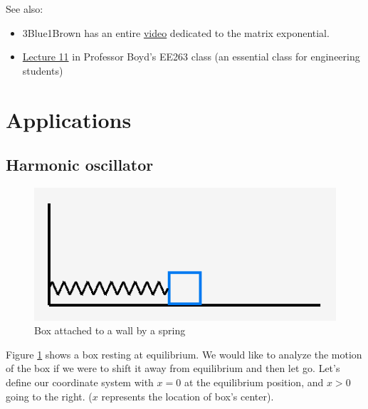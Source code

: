 \documentclass[11pt, oneside]{article}   	%
\begin{document}
See also:
\begin{itemize}
\item 3Blue1Brown has an entire \href{https://youtu.be/O85OWBJ2ayo}{video} dedicated to the matrix exponential.
\item \href{https://www.youtube.com/watch?v=5ePa2UOkEV0&list=PL06960BA52D0DB32B}{Lecture 11} in Professor Boyd's EE263 class
(an essential class for engineering students)
\end{itemize}


\section{Applications}
\subsection*{Harmonic oscillator}

\begin{figure}[h]
\centering
\includegraphics[scale=0.5]{boxspring}
\caption{Box attached to a wall by a spring}
\label{fig:BoxSpring}
\end{figure}

Figure \ref{fig:BoxSpring} shows a box resting at equilibrium.
We would like to analyze the motion of the box if we were to shift it away from equilibrium and then let go.
Let's define our coordinate system with $x = 0$ at the equilibrium position, and $x > 0$ going to the right.
($x$ represents the location of box's center).
\end{document}
